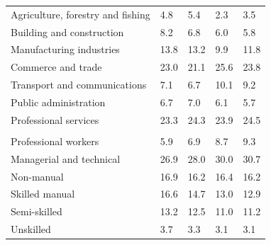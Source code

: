 \documentclass{article}
\begin{document}
\begin{table}[h]
\begin{tabular}{KTTTT}
    \hline
Agriculture, forestry and fishing  & 4.8& 5.4& 2.3& 3.5\\
Building and construction & 8.2& 6.8& 6.0& 5.8\\
Manufacturing industries & 13.8& 13.2&  9.9& 11.8\\
Commerce and trade  & 23.0& 21.1& 25.6& 23.8\\
Transport and communications  &  7.1&  6.7& 10.1&  9.2\\
Public administration & 6.7& 7.0& 6.1& 5.7\\
Professional services & 23.3& 24.3& 23.9& 24.5\\
\hline
    \\ 
    \hline
Professional workers  & 5.9& 6.9 & 8.7& 9.3\\
Managerial and technical & 26.9& 28.0& 30.0& 30.7\\
Non-manual & 16.9& 16.2& 16.4& 16.2\\
Skilled manual & 16.6& 14.7& 13.0& 12.9\\
Semi-skilled & 13.2& 12.5& 11.0& 11.2\\
Unskilled  & 3.7& 3.3& 3.1& 3.1\\
\end{tabular}
\end{table}
\pagebreak
\end{document}
